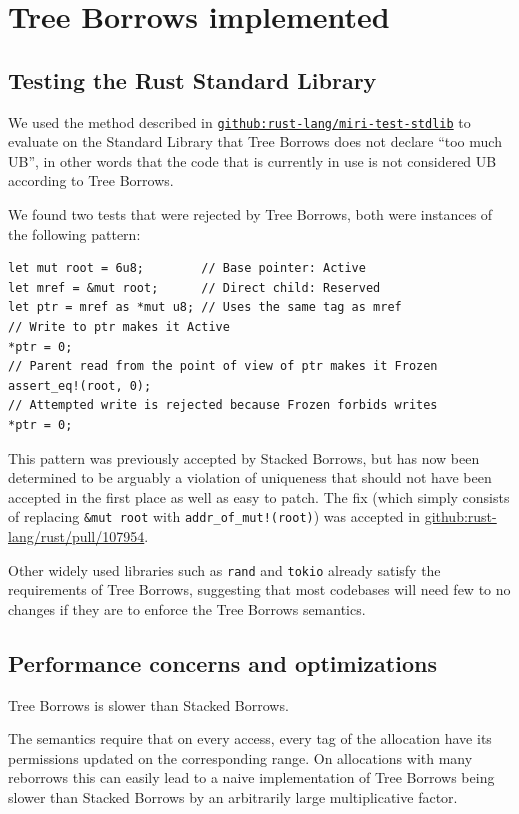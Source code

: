 \documentclass[a4paper,11pt]{article}
\theoremstyle{plain}
\theoremstyle{definition}
\theoremstyle{remark}
\begin{document}
\section{Tree Borrows implemented}

\subsection{Testing the Rust Standard Library}

We used the method described in
\href{https://github.com/rust-lang/miri-test-stdlib}{\texttt{github:rust-lang/miri-test-stdlib}}
to evaluate on the Standard Library that Tree Borrows does not declare ``too much UB'',
in other words that the code that is currently in use is not considered UB according
to Tree Borrows.

We found two tests that were rejected by Tree Borrows, both were instances of the
following pattern:
\begin{lstlisting}
let mut root = 6u8;        // Base pointer: Active
let mref = &mut root;      // Direct child: Reserved
let ptr = mref as *mut u8; // Uses the same tag as mref
// Write to ptr makes it Active
*ptr = 0;
// Parent read from the point of view of ptr makes it Frozen
assert_eq!(root, 0);
// Attempted write is rejected because Frozen forbids writes
*ptr = 0;
\end{lstlisting}

This pattern was previously accepted by Stacked Borrows, but has now been determined
to be arguably a violation of uniqueness that should not have been accepted in the
first place as well as easy to patch. The fix (which simply consists of
replacing \texttt{\&mut root} with \texttt{addr\_of\_mut!(root)}) was accepted
in \href{https://github.com/rust-lang/rust/pull/107954}{github:rust-lang/rust/pull/107954}.


Other widely used libraries such as \texttt{rand} and \texttt{tokio} already
satisfy the requirements of Tree Borrows, suggesting that most codebases will
need few to no changes if they are to enforce the Tree Borrows semantics.

\subsection{Performance concerns and optimizations}

Tree Borrows is slower than Stacked Borrows.

The semantics require that on every access, every tag of the allocation have its
permissions updated on the corresponding range. On allocations with many reborrows
this can easily lead to a naive implementation of Tree Borrows being slower than
Stacked Borrows by an arbitrarily large multiplicative factor.
\end{document}
